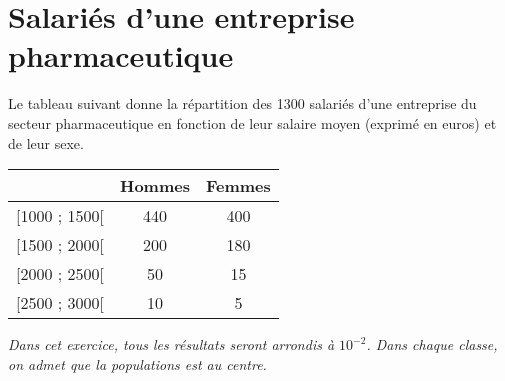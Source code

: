 \section{Salariés d'une entreprise pharmaceutique}

Le tableau suivant donne la répartition des \num{1300} salariés d'une entreprise du secteur pharmaceutique en fonction de leur salaire moyen (exprimé en euros) et de leur sexe.

\begin{center}
	\begin{tabular}{|c|c|c|}
		\hline
		& Hommes & Femmes \\ \hline
		{[}1000 ; 1500{[}  & 440    & 400    \\ \hline
		{[}1500 ; 2000{[}  & 200    & 180    \\ \hline
		{[}2000  ; 2500{[} & 50     & 15     \\ \hline
		{[}2500 ; 3000{[}  & 10     & 5      \\ \hline
	\end{tabular}
\end{center}

\emph{Dans cet exercice, tous les résultats seront arrondis à $10^{-2} $. Dans chaque classe, on admet que la populations est au centre.}



